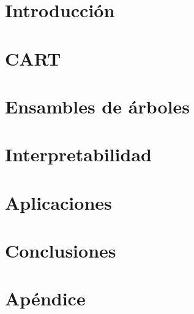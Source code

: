 \documentclass[12pt,twoside]{report}
\begin{document}




\tableofcontents

\chapter{Introducción}


\chapter{CART}


\chapter{Ensambles de árboles}


\chapter{Interpretabilidad}


\chapter{Aplicaciones}


\chapter{Conclusiones}


\appendix
\chapter{Apéndice}




\end{document}
